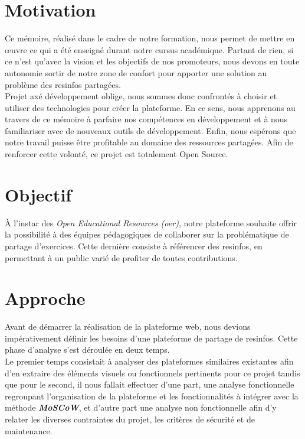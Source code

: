 \section*{Motivation}

Ce mémoire, réalisé dans le cadre de notre formation, nous permet de mettre en œuvre ce qui a été enseigné durant notre cursus académique. Partant de rien, si ce n'est qu'avec la vision et les objectifs de nos promoteurs, nous devons en toute autonomie sortir de notre zone de confort pour apporter une solution au problème des \glspl{resinfo} partagées.\\

Projet axé développement oblige, nous sommes donc confrontés à choisir et utiliser des technologies pour créer la plateforme. En ce sens, nous apprenons au travers de ce mémoire à parfaire nos compétences en développement et à nous familiariser avec de nouveaux outils de développement.
Enfin, nous espérons que notre travail puisse être profitable au domaine des ressources partagées. Afin de renforcer cette volonté, ce projet est totalement Open Source.

\section*{Objectif}

À l’instar des \textit{Open Educational Resources (\Gls{oer})}, notre plateforme souhaite offrir la possibilité à des équipes pédagogiques de collaborer sur la problématique de partage d'exercices. Cette dernière consiste à référencer des \glspl{resinfo}, en permettant à un public varié de profiter de toutes contributions.\\

\section*{Approche}

Avant de démarrer la réalisation de la plateforme web, nous devions impérativement définir les besoins d'une plateforme de partage de \glspl{resinfo}. Cette phase d'analyse s'est déroulée en deux temps.\\

Le premier temps consistait à analyser des plateformes similaires existantes afin d'en extraire des éléments visuels ou fonctionnels pertinents pour ce projet tandis que pour le second, il nous fallait effectuer d'une part, une analyse fonctionnelle regroupant l'organisation de la plateforme et les fonctionnalités à intégrer avec la méthode \textit{\textbf{MoSCoW}}, et d'autre part une analyse non fonctionnelle afin d'y relater les diverses contraintes du projet, les critères de sécurité et de maintenance.\\

